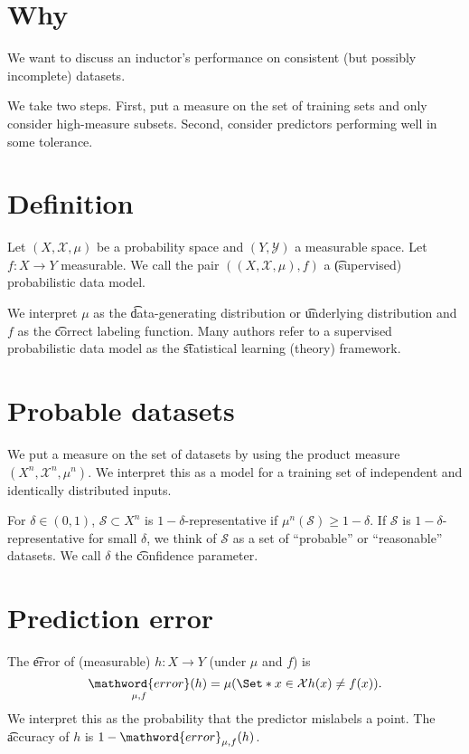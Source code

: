 
\section*{Why}

We want to discuss an inductor's performance on consistent (but possibly incomplete) datasets.

We take two steps. First, put a measure on the set of training sets and only consider high-measure subsets.
Second, consider predictors performing well in some tolerance.

\section*{Definition}

Let $(X, \mathcal{X} , \mu )$ be a probability space and $(Y, \mathcal{Y} )$ a measurable space.
Let $f: X \to Y$ measurable.
We call the pair $((X, \mathcal{X} , \mu ), f)$ a \t{(supervised) probabilistic data model}.

We interpret $\mu $ as the \t{data-generating distribution} or \t{underlying distribution} and $f$ as the \t{correct labeling function}.
Many authors refer to a supervised probabilistic data model as the \t{statistical learning (theory) framework}.

\section*{Probable datasets}

We put a measure on the set of datasets by using the product measure $(X^n, \mathcal{X} ^n, \mu ^n)$.
We interpret this as a model for a training set of independent and identically distributed inputs.


For $\delta  \in (0, 1)$, $\mathcal{S}  \subset X^n$ is \t{$1-\delta $-representative} if $\mu ^n(\mathcal{S} ) \geq 1 - \delta $.
If $\mathcal{S} $ is $1-\delta $-representative for small $\delta $, we think of $\mathcal{S} $ as a set of ``probable'' or ``reasonable'' datasets.
We call $\delta $ the \t{confidence parameter}.

\section*{Prediction error}

The \t{error} of (measurable) $h: X \to Y$ (under $\mu $ and $f$) is
\[
\underset{\mu , f}{\mathword{error}}(h) = \mu (\Set*{x \in \mathcal{X} }{h(x) \neq f(x)}).
\]
We interpret this as the probability that the predictor mislabels a point.
The \t{accuracy} of $h$ is $1 - \mathword{error}_{\mu , f}(h)$.


